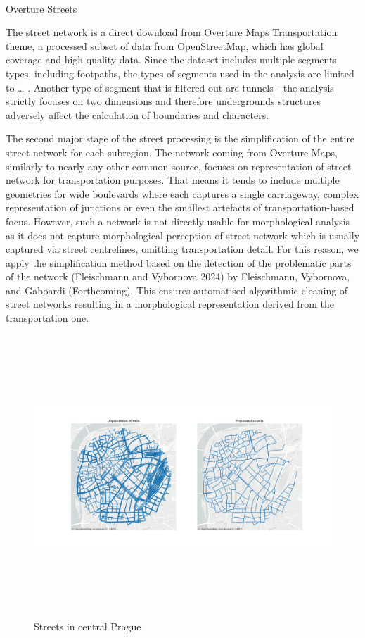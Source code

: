 \documentclass[
  letterpaper,
  DIV=11,
  numbers=noendperiod]{scrartcl}
\makeatletter
\let\oldparagraph\paragraph
\renewcommand{\paragraph}{
    \@ifstar
      \xxxParagraphStar
      \xxxParagraphNoStar
  }
\newcommand{\xxxParagraphStar}[1]{\oldparagraph*{#1}\mbox{}}
\newcommand{\xxxParagraphNoStar}[1]{\oldparagraph{#1}\mbox{}}
\makeatother
\begin{document}
\paragraph{Overture Streets}\label{overture-streets}

The street network is a direct download from Overture Maps
Transportation theme, a processed subset of data from OpenStreetMap,
which has global coverage and high quality data. Since the dataset
includes multiple segments types, including footpaths, the types of
segments used in the analysis are limited to \ldots{} . Another type of
segment that is filtered out are tunnels - the analysis strictly focuses
on two dimensions and therefore undergrounds structures adversely affect
the calculation of boundaries and characters.

The second major stage of the street processing is the simplification of
the entire street network for each subregion. The network coming from
Overture Maps, similarly to nearly any other common source, focuses on
representation of street network for transportation purposes. That means
it tends to include multiple geometries for wide boulevards where each
captures a single carriageway, complex representation of junctions or
even the smallest artefacts of transportation-based focus. However, such
a network is not directly usable for morphological analysis as it does
not capture morphological perception of street network which is usually
captured via street centrelines, omitting transportation detail. For
this reason, we apply the simplification method based on the detection
of the problematic parts of the network (Fleischmann and Vybornova 2024)
by Fleischmann, Vybornova, and Gaboardi (Forthcoming). This ensures
automatised algorithmic cleaning of street networks resulting in a
morphological representation derived from the transportation one.

\begin{figure}[H]

{\centering \includegraphics[width=\linewidth,height=4.16667in,keepaspectratio]{../figures/algo_design/street_processing.png}

}

\caption{Streets in central Prague}

\end{figure}%
\end{document}
